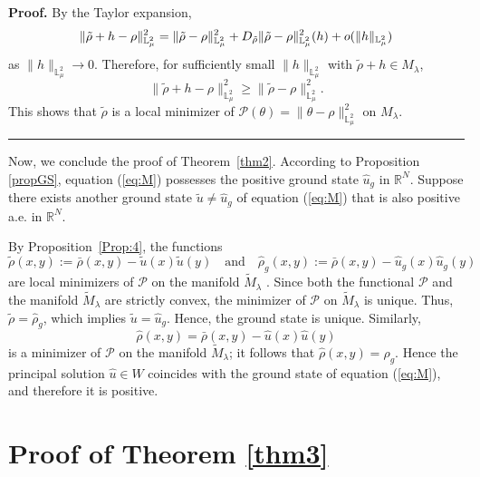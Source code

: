 \documentclass[12pt,thmsa]{article}
\newenvironment{proof}[1][Proof]{\noindent\textbf{#1.} }{\ \rule{0.5em}{0.5em}}
\begin{document}
\begin{proof}
By the Taylor expansion,
\begin{equation*}
\|\tilde{\rho} + h - \rho\|_{\mathbb{L}_{\mu}^2}^2 = \|\tilde{\rho} -
\rho\|_{\mathbb{L}_{\mu}^2}^2 + D_{\tilde{\rho}} \|\tilde{\rho} - \rho\|_{%
\mathbb{L}_{\mu}^2}^2 (h) + o(\|h\|_{\mathbb{L}_{\mu}^2})
\end{equation*}
as $\|h\|_{\mathbb{L}_{\mu}^2} \to 0$. Therefore, for sufficiently small $%
\|h\|_{\mathbb{L}_{\mu}^2}$ with $\tilde{\rho} + h \in M_{\lambda}$,
\begin{equation*}
\|\tilde{\rho} + h - \rho\|_{\mathbb{L}_{\mu}^2}^2 \geq \|\tilde{\rho} -
\rho\|_{\mathbb{L}_{\mu}^2}^2.
\end{equation*}
This shows that $\tilde{\rho}$ is a local minimizer of $\mathcal{P}(\theta)
= \|\theta - \rho\|_{\mathbb{L}_{\mu}^2}^2$ on $M_{\lambda}$.
\end{proof}

Now, we conclude the proof of Theorem~\ref{thm2}. According to Proposition~%
\ref{propGS}, equation (\ref{eq:M}) possesses the positive ground state $%
\hat{u}_{g}$ in $\mathbb{R}^{N}$. Suppose there exists another ground state $%
\tilde{u}\neq \hat{u}_{g}$ of equation (\ref{eq:M}) that is also positive
a.e. in $\mathbb{R}^{N}$.

By Proposition~\ref{Prop:4}, the functions
\begin{equation*}
\tilde{\rho}(x,y):=\bar{\rho}(x,y)-\tilde{u}(x)\tilde{u}(y)\quad \text{and}%
\quad \hat{\rho}_{g}(x,y):=\bar{\rho}(x,y)-\hat{u}_{g}(x)\hat{u}_{g}(y)
\end{equation*}%
are local minimizers of $\mathcal{P}$ on the manifold $\tilde{M}_{\lambda }$%
. Since both the functional $\mathcal{P}$ and the manifold $\tilde{M}%
_{\lambda }$ are strictly convex, the minimizer of $\mathcal{P}$ on $\tilde{M%
}_{\lambda }$ is unique. Thus, $\tilde{\rho}=\hat{\rho}_{g}$, which implies $%
\tilde{u}=\hat{u}_{g}$. Hence, the ground state is unique. Similarly,
\begin{equation*}
\hat{\rho}(x,y)=\bar{\rho}(x,y)-\hat{u}(x)\hat{u}(y)
\end{equation*}%
is a minimizer of $\mathcal{P}$ on the manifold $\tilde{M}_{\lambda }$; it
follows that $\hat{\rho}(x,y)=\hat{\rho}_{g}$. Hence the principal solution $%
\hat{u}\in W$ coincides with the ground state of equation (\ref{eq:M}), and
therefore it is positive.

\section{Proof of Theorem \protect\ref{thm3}}
\end{document}
